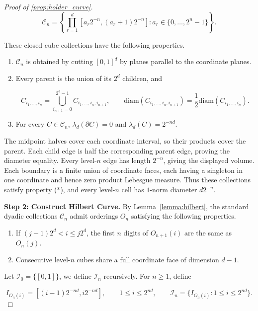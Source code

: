 \begin{proof}[Proof of \cref{prop:holder_curve}]
\[
\mathcal C_n=\left\{\prod_{r=1}^d[a_r2^{-n},(a_r+1)2^{-n}]:a_r\in\{0,\ldots,2^n-1\}\right\}.
\]

These closed cube collections have the following properties.
\begin{enumerate}
\item $\mathcal C_n$ is obtained by cutting $[0,1]^d$ by planes parallel to the coordinate planes.
\item Every parent is the union of its $2^d$ children, and

\[
C_{i_1,\ldots,i_n}=\bigcup_{i_{n+1}=0}^{2^d-1}C_{i_1,\ldots,i_n,i_{n+1}},\qquad
\text{diam}(C_{i_1,\ldots,i_n,i_{n+1}})=\frac12\text{diam}(C_{i_1,\ldots,i_n}).
\]

\item For every $C\in\mathcal C_n$, $\lambda_d(\partial C)=0$ and $\lambda_d(C)=2^{-nd}$.
\end{enumerate}
The midpoint halves cover each coordinate interval, so their products cover the parent. Each child edge is half the corresponding parent edge, proving the diameter equality. Every level-$n$ edge has length $2^{-n}$, giving the displayed volume. Each boundary is a finite union of coordinate faces, each having a singleton in one coordinate and hence zero product Lebesgue measure. Thus these collections satisfy property (*), and every level-$n$ cell has $1$-norm diameter $d2^{-n}$. \par\textbf{Step 2: Construct Hilbert Curve.} By Lemma~\ref{lemma:hilbert}, the standard dyadic collections $\mathcal C_n$ admit orderings $O_n$ satisfying the following properties.
\begin{enumerate}
\item If $(j-1)2^d<i\leqslant j2^d$, the first $n$ digits of $O_{n+1}(i)$ are the same as $O_n(j)$.
\item Consecutive level-$n$ cubes share a full coordinate face of dimension $d-1$.
\end{enumerate}
Let $ \mathcal{I}_{0} =\{[ 0,1]\}$, we define $ \mathcal{I}_{n}$ recursively. For $n\geqslant1$, define

\[
I_{O_n(i)}=[(i-1)2^{-nd},i2^{-nd}],\qquad 1\leqslant i\leqslant2^{nd},\qquad
\mathcal I_n=\{I_{O_n(i)}:1\leqslant i\leqslant2^{nd}\}.
\]


\end{proof}
